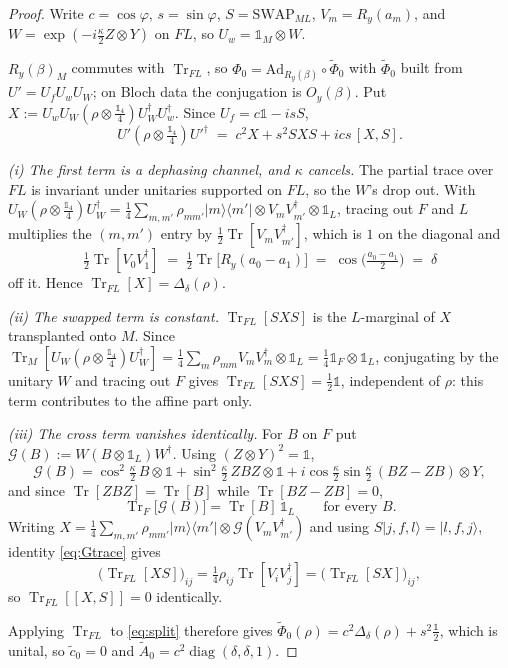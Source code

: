 \documentclass[11pt,a4paper]{article}
\theoremstyle{definition}
\theoremstyle{remark}
\DeclareMathOperator{\Tr}{Tr}
\DeclareMathOperator{\diag}{diag}
\newcommand{\I}{\mathbb{1}}
\begin{document}
\begin{proof}
Write $c = \cos\varphi$, $s = \sin\varphi$, $S = \mathrm{SWAP}_{ML}$, $V_m = R_y(a_m)$, and $W = \exp(-i\tfrac\kappa2 Z\otimes Y)$ on $FL$, so $U_w = \I_M\otimes W$.

$R_y(\beta)_M$ commutes with $\Tr_{FL}$, so $\Phi_0 = \mathrm{Ad}_{R_y(\beta)}\circ\tilde\Phi_0$ with $\tilde\Phi_0$ built from $U' = U_fU_wU_W$; on Bloch data the conjugation is $O_y(\beta)$. Put $X := U_wU_W(\rho\otimes\tfrac{\I_4}{4})U_W^\dagger U_w^\dagger$. Since $U_f = c\I - isS$,
\begin{equation}\label{eq:split}
  U'(\rho\otimes\tfrac{\I_4}{4})U'^\dagger \;=\; c^2X + s^2SXS + ics\,[X,S].
\end{equation}

\emph{(i) The first term is a dephasing channel, and $\kappa$ cancels.} The partial trace over $FL$ is invariant under unitaries supported on $FL$, so the $W$'s drop out. With
$U_W(\rho\otimes\tfrac{\I_4}{4})U_W^\dagger = \tfrac14\sum_{m,m'}\rho_{mm'}|m\rangle\!\langle m'|\otimes V_mV_{m'}^\dagger\otimes\I_L$,
tracing out $F$ and $L$ multiplies the $(m,m')$ entry by $\tfrac12\Tr[V_mV_{m'}^\dagger]$, which is $1$ on the diagonal and
\[
  \tfrac12\Tr[V_0V_1^\dagger] \;=\; \tfrac12\Tr\big[R_y(a_0-a_1)\big] \;=\; \cos\!\big(\tfrac{a_0-a_1}{2}\big) \;=\; \delta
\]
off it. Hence $\Tr_{FL}[X] = \Delta_\delta(\rho)$.

\emph{(ii) The swapped term is constant.} $\Tr_{FL}[SXS]$ is the $L$-marginal of $X$ transplanted onto $M$. Since $\Tr_M[U_W(\rho\otimes\tfrac{\I_4}{4})U_W^\dagger] = \tfrac14\sum_m\rho_{mm}V_mV_m^\dagger\otimes\I_L = \tfrac14\I_F\otimes\I_L$, conjugating by the unitary $W$ and tracing out $F$ gives $\Tr_{FL}[SXS] = \tfrac12\I$, independent of $\rho$: this term contributes to the affine part only.

\emph{(iii) The cross term vanishes identically.} For $B$ on $F$ put $\mathcal G(B) := W(B\otimes\I_L)W^\dagger$. Using $(Z\otimes Y)^2 = \I$,
\[
  \mathcal G(B) = \cos^2\!\tfrac\kappa2\,B\otimes\I + \sin^2\!\tfrac\kappa2\,ZBZ\otimes\I + i\cos\tfrac\kappa2\sin\tfrac\kappa2\,(BZ-ZB)\otimes Y,
\]
and since $\Tr[ZBZ] = \Tr[B]$ while $\Tr[BZ-ZB] = 0$,
\begin{equation}\label{eq:Gtrace}
  \Tr_F\big[\mathcal G(B)\big] = \Tr[B]\,\I_L \qquad\text{for every }B.
\end{equation}
Writing $X = \tfrac14\sum_{m,m'}\rho_{mm'}|m\rangle\!\langle m'|\otimes\mathcal G(V_mV_{m'}^\dagger)$ and using $S|j,f,l\rangle = |l,f,j\rangle$, identity \eqref{eq:Gtrace} gives
\[
  \big(\Tr_{FL}[XS]\big)_{ij} = \tfrac14\rho_{ij}\Tr[V_iV_j^\dagger] = \big(\Tr_{FL}[SX]\big)_{ij},
\]
so $\Tr_{FL}[[X,S]] = 0$ identically.

Applying $\Tr_{FL}$ to \eqref{eq:split} therefore gives $\tilde\Phi_0(\rho) = c^2\Delta_\delta(\rho) + s^2\tfrac{\I}{2}$, which is unital, so $\tilde c_0 = 0$ and $\tilde A_0 = c^2\diag(\delta,\delta,1)$.
\end{proof}
\end{document}
